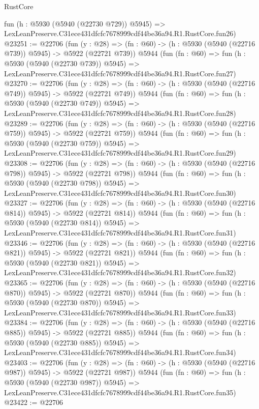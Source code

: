 \begin{lexlean}{RustCore}
\begin{coremodule}
    fun (h : @5930 (@5940 (@22730 @729)) @5945) =>
    LexLeanPreserve.C31ece431dfcfc7678999cdf44be36a94.R1.RustCore.fun26)
@23251 := @22706
    (fun (y : @28) => (fn : @60) -> (h : @5930 (@5940 (@22716 @739)) @5945) -> @5922 (@22721 @739))
    @5944
    (fun (fn : @60) =>
    fun (h : @5930 (@5940 (@22730 @739)) @5945) =>
    LexLeanPreserve.C31ece431dfcfc7678999cdf44be36a94.R1.RustCore.fun27)
@23270 := @22706
    (fun (y : @28) => (fn : @60) -> (h : @5930 (@5940 (@22716 @749)) @5945) -> @5922 (@22721 @749))
    @5944
    (fun (fn : @60) =>
    fun (h : @5930 (@5940 (@22730 @749)) @5945) =>
    LexLeanPreserve.C31ece431dfcfc7678999cdf44be36a94.R1.RustCore.fun28)
@23289 := @22706
    (fun (y : @28) => (fn : @60) -> (h : @5930 (@5940 (@22716 @759)) @5945) -> @5922 (@22721 @759))
    @5944
    (fun (fn : @60) =>
    fun (h : @5930 (@5940 (@22730 @759)) @5945) =>
    LexLeanPreserve.C31ece431dfcfc7678999cdf44be36a94.R1.RustCore.fun29)
@23308 := @22706
    (fun (y : @28) => (fn : @60) -> (h : @5930 (@5940 (@22716 @798)) @5945) -> @5922 (@22721 @798))
    @5944
    (fun (fn : @60) =>
    fun (h : @5930 (@5940 (@22730 @798)) @5945) =>
    LexLeanPreserve.C31ece431dfcfc7678999cdf44be36a94.R1.RustCore.fun30)
@23327 := @22706
    (fun (y : @28) => (fn : @60) -> (h : @5930 (@5940 (@22716 @814)) @5945) -> @5922 (@22721 @814))
    @5944
    (fun (fn : @60) =>
    fun (h : @5930 (@5940 (@22730 @814)) @5945) =>
    LexLeanPreserve.C31ece431dfcfc7678999cdf44be36a94.R1.RustCore.fun31)
@23346 := @22706
    (fun (y : @28) => (fn : @60) -> (h : @5930 (@5940 (@22716 @821)) @5945) -> @5922 (@22721 @821))
    @5944
    (fun (fn : @60) =>
    fun (h : @5930 (@5940 (@22730 @821)) @5945) =>
    LexLeanPreserve.C31ece431dfcfc7678999cdf44be36a94.R1.RustCore.fun32)
@23365 := @22706
    (fun (y : @28) => (fn : @60) -> (h : @5930 (@5940 (@22716 @870)) @5945) -> @5922 (@22721 @870))
    @5944
    (fun (fn : @60) =>
    fun (h : @5930 (@5940 (@22730 @870)) @5945) =>
    LexLeanPreserve.C31ece431dfcfc7678999cdf44be36a94.R1.RustCore.fun33)
@23384 := @22706
    (fun (y : @28) => (fn : @60) -> (h : @5930 (@5940 (@22716 @885)) @5945) -> @5922 (@22721 @885))
    @5944
    (fun (fn : @60) =>
    fun (h : @5930 (@5940 (@22730 @885)) @5945) =>
    LexLeanPreserve.C31ece431dfcfc7678999cdf44be36a94.R1.RustCore.fun34)
@23403 := @22706
    (fun (y : @28) => (fn : @60) -> (h : @5930 (@5940 (@22716 @987)) @5945) -> @5922 (@22721 @987))
    @5944
    (fun (fn : @60) =>
    fun (h : @5930 (@5940 (@22730 @987)) @5945) =>
    LexLeanPreserve.C31ece431dfcfc7678999cdf44be36a94.R1.RustCore.fun35)
@23422 := @22706

\end{coremodule}
\end{lexlean}
